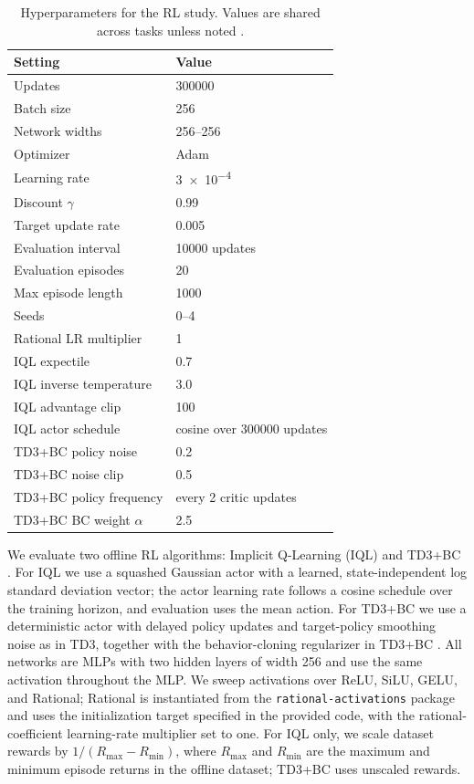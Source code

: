 \documentclass{article}
\theoremstyle{plain}
\theoremstyle{definition}
\theoremstyle{remark}
\begin{document}
\begin{table}
\centering
\caption{Hyperparameters for the RL study. Values are shared across tasks unless noted \cite{kostrikov2021iql,fujimoto2021td3bc}.}
\label{tab:offline_rl_hparams}
\footnotesize
\begin{tabular}{@{}p{}p{}@{}}
\toprule
Setting & Value \\
\midrule
Updates & \num{300000} \\
Batch size & 256 \\
Network widths & 256--256 \\
Optimizer & Adam \\
Learning rate & \num{3e-4} \\
Discount $\gamma$ & 0.99 \\
Target update rate & 0.005 \\
Evaluation interval & \num{10000} updates \\
Evaluation episodes & 20 \\
Max episode length & 1000 \\
Seeds & 0--4 \\
Rational LR multiplier & 1 \\
\addlinespace
IQL expectile & 0.7 \\
IQL inverse temperature & 3.0 \\
IQL advantage clip & 100 \\
IQL actor schedule & cosine over \num{300000} updates \\
\addlinespace
TD3+BC policy noise & 0.2 \\
TD3+BC noise clip & 0.5 \\
TD3+BC policy frequency & every 2 critic updates \\
TD3+BC BC weight $\alpha$ & 2.5 \\
\bottomrule
\end{tabular}
\end{table}

We evaluate two offline RL algorithms: Implicit Q-Learning (IQL) \cite{kostrikov2021iql} and TD3+BC \cite{fujimoto2021td3bc}. For IQL we use a squashed Gaussian actor with a learned, state-independent log standard deviation vector; the actor learning rate follows a cosine schedule over the training horizon, and evaluation uses the mean action. For TD3+BC we use a deterministic actor with delayed policy updates and target-policy smoothing noise as in TD3, together with the behavior-cloning regularizer in TD3+BC \cite{fujimoto2021td3bc}. All networks are MLPs with two hidden layers of width 256 and use the same activation throughout the MLP. We sweep activations over ReLU, SiLU, GELU, and Rational; Rational is instantiated from the \texttt{rational-activations} package \cite{delfosse2020rationals} and uses the initialization target specified in the provided code, with the rational-coefficient learning-rate multiplier set to one. For IQL only, we scale dataset rewards by $1/(R_{\max}-R_{\min})$, where $R_{\max}$ and $R_{\min}$ are the maximum and minimum episode returns in the offline dataset; TD3+BC uses unscaled rewards.
\end{document}

